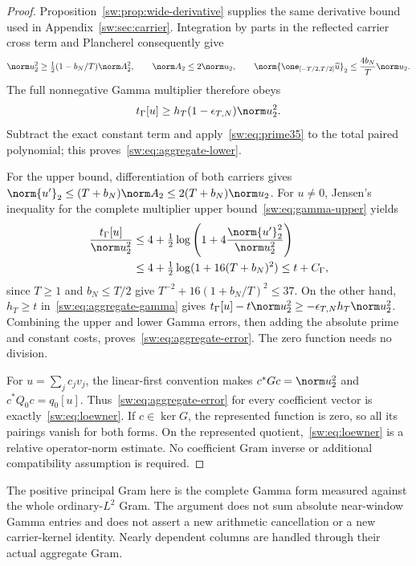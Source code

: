 \documentclass[11pt,a4paper]{article}
\numberwithin{equation}{section}
\theoremstyle{definition}\newtheorem{definition}[theorem]{Definition}
\theoremstyle{remark}\newtheorem{remark}[theorem]{Remark}
\newcommand{\tg}{t_\Gamma}\newcommand{\cg}{c_\Gamma}
\begin{document}
\begin{proof}
Proposition~\ref{sw:prop:wide-derivative} supplies the same derivative bound used in Appendix~\ref{sw:sec:carrier}. Integration by parts in the reflected carrier cross term and Plancherel consequently give
\[
 \norm u_2^2\ge\tfrac12(1-b_N/T)\norm A_2^2,
 \qquad \norm A_2\le2\norm u_2,
 \qquad
 \norm{\one_{[-T/2,T/2]}\widehat u}_2\le\frac{4b_N}{T}\norm u_2.
\]
The full nonnegative Gamma multiplier therefore obeys
\begin{equation}\label{sw:eq:aggregate-gamma}
 \tg[u]\ge h_T(1-\epsilon_{T,N})\norm u_2^2.
\end{equation}
Subtract the exact constant term and apply~\eqref{sw:eq:prime35} to the total paired polynomial; this proves~\eqref{sw:eq:aggregate-lower}.

For the upper bound, differentiation of both carriers gives
$\norm{u'}_2\le(T+b_N)\norm A_2\le2(T+b_N)\norm u_2$.
For $u\ne0$, Jensen's inequality for the complete multiplier upper bound~\eqref{sw:eq:gamma-upper} yields
\begin{align*}
 \frac{\tg[u]}{\norm u_2^2}
 &\le4+\tfrac12\log\left(1+4\frac{\norm{u'}_2^2}{\norm u_2^2}\right)\\
 &\le4+\tfrac12\log(1+16(T+b_N)^2)
 \le t+C_\Gamma,
\end{align*}
since $T\ge1$ and $b_N\le T/2$ give $T^{-2}+16(1+b_N/T)^2\le37$. On the other hand, $h_T\ge t$ in~\eqref{sw:eq:aggregate-gamma} gives
$\tg[u]-t\norm u_2^2\ge-\epsilon_{T,N}h_T\norm u_2^2$.
Combining the upper and lower Gamma errors, then adding the absolute prime and constant costs, proves~\eqref{sw:eq:aggregate-error}. The zero function needs no division.

For $u=\sum_jc_jv_j$, the linear-first convention makes $c^*Gc=\norm u_2^2$ and $c^*Q_0c=q_0[u]$. Thus~\eqref{sw:eq:aggregate-error} for every coefficient vector is exactly~\eqref{sw:eq:loewner}. If $c\in\ker G$, the represented function is zero, so all its pairings vanish for both forms. On the represented quotient,~\eqref{sw:eq:loewner} is a relative operator-norm estimate. No coefficient Gram inverse or additional compatibility assumption is required.
\end{proof}
The positive principal Gram here is the complete Gamma form measured against the whole ordinary-$L^2$ Gram. The argument does not sum absolute near-window Gamma entries and does not assert a new arithmetic cancellation or a new carrier-kernel identity. Nearly dependent columns are handled through their actual aggregate Gram.
\end{document}
